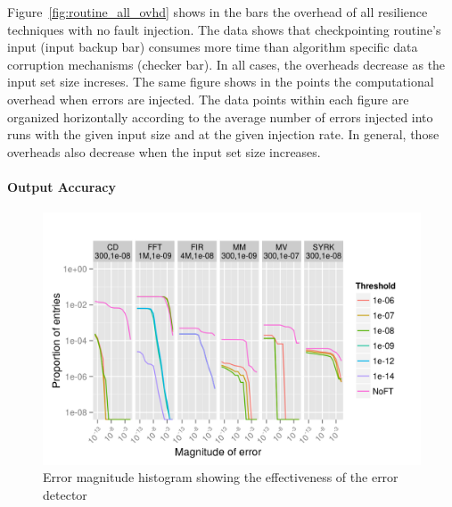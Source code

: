 \documentclass{sig-alternate}
\begin{document}
Figure~\ref{fig:routine_all_ovhd} shows in the bars the overhead of all resilience techniques with no fault injection.
The data shows that checkpointing routine's input (input backup bar) consumes more time than algorithm specific data corruption mechanisms (checker bar). In all cases, the overheads decrease as the input set size increses.
The same figure shows in the points the computational overhead when errors are injected. 
The data points within each figure are organized horizontally according to the average number of errors injected into runs with the given input size and at the given injection rate.
In general, those overheads also decrease when the input set size increases.  

\paragraph{Output Accuracy}

\begin{figure}[ht!]
\centering
\includegraphics[width=1.00\columnwidth]{figs/4_1_1_Exp2_1_Example.png}
\caption{Error magnitude histogram showing the effectiveness of the error detector}
\label{fig:algo_err_dist}
\end{figure}
\end{document}
